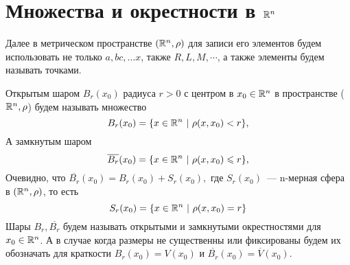 \documentclass[../main.tex]{subfiles}
\begin{document}
	
	\section{Множества и окрестности в $\mathbb{R}^n$}
	Далее в метрическом пространстве $(\mathbb{R}^n, \rho)$ для записи его элементов будем использовать не только $a, b c, \dots x$, также $R, L, M, \cdots$, а также элементы будем называть точками.
	
	Открытым шаром $B_r(x_0)$ радиуса $r > 0$ с центром в $x_0 \in \mathbb{R}^n$ в пространстве ($\mathbb{R}^n, \rho$) будем называть множество 
	$$
	B_r(x_0) = \{x \in \R^n\ |\ \rho(x, x_0) < r\}, 
	$$
	А замкнутым шаром
	$$
	\overline{B_r}(x_0) = \{x \in \mathbb{R}^n\ |\ \rho(x, x_0) \leqslant r\}, 
	$$ 
	Очевидно, что $\overline{B_r}(x_0) = B_r(x_0) + S_r(x_0),$ где $ S_r(x_0)$~--- n-мерная сфера в  $(\mathbb{R}^n, \rho)$, то есть 
	$$
	S_r(x_0) = \{x \in \mathbb{R}^n\ |\ \rho(x, x_0) = r\}
	$$ 
	Шары $B_r, \overline{B_r}$ будем называть открытыми и замкнутыми окрестностями для $x_0 \in \mathbb{R}^n$. А в случае когда размеры не существенны или фиксированы будем их обозначать для краткости $B_r(x_0) = V(x_0)$ и $\overline{B_r}(x_0) = \overline{V}(x_0)$.
	
\end{document}
